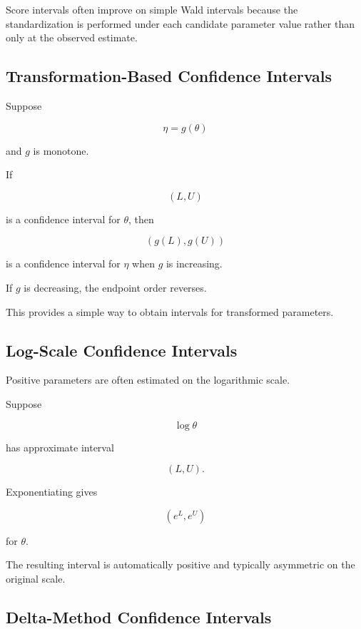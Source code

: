 Score intervals often improve on simple Wald intervals because the
standardization is performed under each candidate parameter value rather
than only at the observed estimate.

\subsection{Transformation-Based Confidence Intervals}
\label{subsec:transformation-confidence-intervals}

Suppose

\[
\eta=g(\theta)
\]

and \(g\) is monotone.

If

\[
(L,U)
\]

is a confidence interval for \(\theta\), then

\[
\boxed{
(g(L),g(U))
}
\]

is a confidence interval for \(\eta\) when \(g\) is increasing.

If \(g\) is decreasing, the endpoint order reverses.

This provides a simple way to obtain intervals for transformed
parameters.

\subsection{Log-Scale Confidence Intervals}
\label{subsec:log-scale-confidence-intervals}

Positive parameters are often estimated on the logarithmic scale.

Suppose

\[
\log\theta
\]

has approximate interval

\[
(L,U).
\]

Exponentiating gives

\[
\boxed{
(e^L,e^U)
}
\]

for \(\theta\).

The resulting interval is automatically positive and typically
asymmetric on the original scale.

\subsection{Delta-Method Confidence Intervals}
\label{subsec:delta-method-confidence-intervals}

